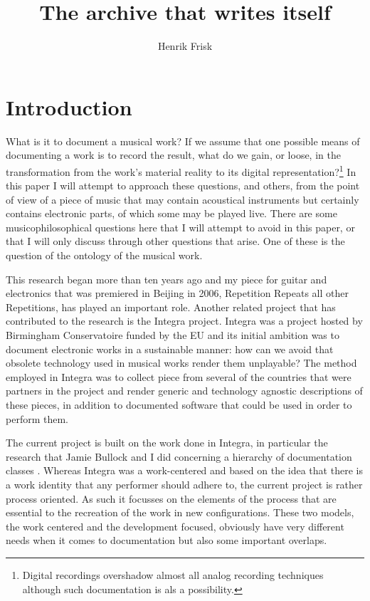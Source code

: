 \documentclass[12pt]{article}
\author{Henrik Frisk}
\title{The archive that writes itself}
\begin{document}
\maketitle

\section{Introduction}
\label{sec:introduction}


What is it to document a musical work? If we assume that one possible means of documenting a work is to record the result, what do we gain, or loose, in the transformation from the work's material reality to its digital representation?\footnote{Digital recordings overshadow almost all analog recording techniques although such documentation is als a possibility.} In this paper I will attempt to approach these questions, and others, from the point of view of a piece of music that may contain acoustical instruments but certainly contains electronic parts, of which some may be played live. There are some musicophilosophical questions here that I will attempt to avoid in this paper, or that I will only discuss through other questions that arise. One of these is the question of the ontology of the musical work. 

This research began more than ten years ago and my piece for guitar and electronics that was premiered in Beijing in 2006, Repetition Repeats all other Repetitions, has played an important role. Another related project that has contributed to the research is the Integra project. Integra was a project hosted by Birmingham Conservatoire funded by the EU and its initial ambition was to document electronic works in a sustainable manner: how can we avoid that obsolete technology used in musical works render them unplayable? The method employed in Integra was to collect piece from several of the countries that were partners in the project and render generic and technology agnostic descriptions of these pieces, in addition to documented software that could be used in order to perform them.

The current project is built on the work done in Integra, in particular the research that Jamie Bullock and I did concerning a hierarchy of documentation classes . Whereas Integra was a work-centered and based on the idea that there is a work identity that any performer should adhere to, the current project is rather process oriented. As such it focusses on the elements of the process that are essential to the recreation of the work in new configurations. These two models, the work centered and the development focused, obviously have very different needs when it comes to documentation but also some important overlaps.
\end{document}
